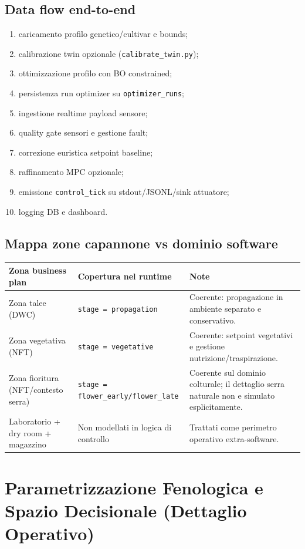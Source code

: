 ﻿\documentclass[11pt,a4paper]{report}
\begin{document}
\section{Data flow end-to-end}
\begin{enumerate}
  \item caricamento profilo genetico/cultivar e bounds;
  \item calibrazione twin opzionale (\texttt{calibrate\_twin.py});
  \item ottimizzazione profilo con BO constrained;
  \item persistenza run optimizer su \texttt{optimizer\_runs};
  \item ingestione realtime payload sensore;
  \item quality gate sensori e gestione fault;
  \item correzione euristica setpoint baseline;
  \item raffinamento MPC opzionale;
  \item emissione \texttt{control\_tick} su stdout/JSONL/sink attuatore;
  \item logging DB e dashboard.
\end{enumerate}

\section{Mappa zone capannone vs dominio software}
\begin{longtable}{@{}p{4.2cm}p{4.0cm}p{6.8cm}@{}}
\toprule
Zona business plan & Copertura nel runtime & Note \\ \midrule
Zona talee (DWC) & \texttt{stage = propagation} & Coerente: propagazione in ambiente separato e conservativo. \\
Zona vegetativa (NFT) & \texttt{stage = vegetative} & Coerente: setpoint vegetativi e gestione nutrizione/traspirazione. \\
Zona fioritura (NFT/contesto serra) & \texttt{stage = flower\_early/flower\_late} & Coerente sul dominio colturale; il dettaglio serra naturale non e simulato esplicitamente. \\
Laboratorio + dry room + magazzino & Non modellati in logica di controllo & Trattati come perimetro operativo extra-software. \\
\bottomrule
\end{longtable}

\newpage
\chapter{Parametrizzazione Fenologica e Spazio Decisionale (Dettaglio Operativo)}
\end{document}
